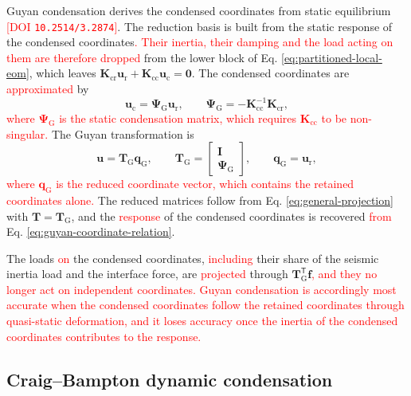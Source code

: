 \documentclass[11pt,a4paper]{article}
\numberwithin{equation}{section}
\newcommand{\rev}[1]{\textcolor{red}{#1}}
\begin{document}
Guyan condensation derives the condensed coordinates from static equilibrium \cite{Guyan1965}\,\rev{[DOI \nolinkurl{10.2514/3.2874}]}. The reduction basis is built from the static response of the condensed coordinates\rev{. Their inertia, their damping and the load acting on them are therefore dropped} from the lower block of Eq. \eqref{eq:partitioned-local-eom}, which leaves \(\mathbf{K}_{\mathrm{cr}}\bm{u}_{\mathrm{r}}+\mathbf{K}_{\mathrm{cc}}\bm{u}_{\mathrm{c}}=\bm{0}\). The condensed coordinates are \rev{approximated} by
\begin{equation}
	\bm{u}_{\mathrm{c}}=\bm{\Psi}_{\mathrm{G}}\bm{u}_{\mathrm{r}},
	\qquad
	\bm{\Psi}_{\mathrm{G}}=-\mathbf{K}_{\mathrm{cc}}^{-1}\mathbf{K}_{\mathrm{cr}},
	\label{eq:guyan-coordinate-relation}
\end{equation}
\rev{where \(\bm{\Psi}_{\mathrm{G}}\) is the static condensation matrix, which requires \(\mathbf{K}_{\mathrm{cc}}\) to be non-singular.}
The Guyan transformation is
\begin{equation}
	\bm{u}=\mathbf{T}_{\mathrm{G}}\bm{q}_{\mathrm{G}},
	\qquad
	\mathbf{T}_{\mathrm{G}}=
	\begin{bmatrix}
		\mathbf{I}\\
		\bm{\Psi}_{\mathrm{G}}
	\end{bmatrix},
	\qquad
	\bm{q}_{\mathrm{G}}=\bm{u}_{\mathrm{r}},
	\label{eq:guyan-transformation}
\end{equation}
\rev{where \(\bm{q}_{\mathrm{G}}\) is the reduced coordinate vector, which contains the retained coordinates alone.} The reduced matrices follow from Eq. \eqref{eq:general-projection} with \(\mathbf{T}=\mathbf{T}_{\mathrm{G}}\), and the \rev{response} of the condensed coordinates is recovered \rev{from} Eq. \eqref{eq:guyan-coordinate-relation}.

The loads \rev{on} the condensed coordinates, \rev{including} their share of the seismic inertia load and the interface force, are \rev{projected} through \(\mathbf{T}_{\mathrm{G}}^{\mathsf{T}}\bm{f}\)\rev{, and they no longer act on independent coordinates. Guyan condensation is accordingly most accurate when the condensed coordinates follow the retained coordinates through quasi-static deformation, and it loses accuracy once the inertia of the condensed coordinates contributes to the response.}

\subsection{Craig--Bampton dynamic condensation}
\label{sec:cb-condensation}
\end{document}
